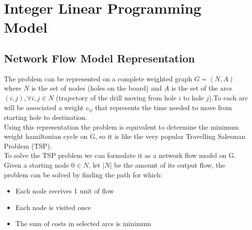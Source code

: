 \section{Integer Linear Programming Model}
	\subsection{Network Flow Model Representation}
		The problem can be represented on a complete weighted graph $G=(N, A)$ where $N$ is the set of nodes (holes on the board) and $A$ is the set of the arcs $(i, j), ∀ i, j ∈ N$ (trajectory of the drill moving from hole $i$ to hole $j$).To each arc will be associated a weight $c_{ij}$ that represents the time needed to move from starting hole to destination.\\
		Using this representation the problem is equivalent to determine the minimum weight hamiltonian cycle on G, so it is like the very popular Travelling Salesman Problem (TSP).\\
		To solve the TSP problem we can formulate it as a network flow model on G. Given a starting node $0 ∈ N$, let $|N|$ be the amount of its output flow, the problem can be solved by finding the path for which:
		\begin{itemize}
			\item Each node receives 1 unit of flow
			\item Each node is visited once
			\item The sum of costs in selected arcs is minimum
		\end{itemize}
		
